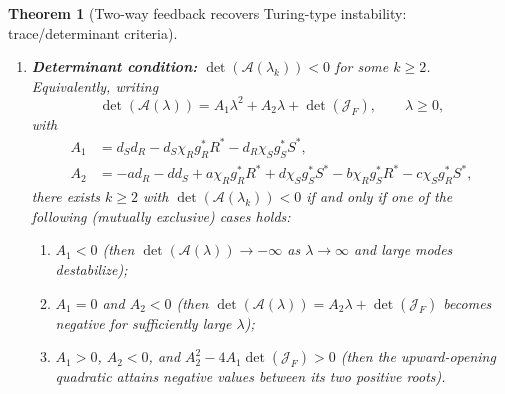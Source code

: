 \documentclass[10pt,a4paper]{amsart}
\newtheorem{theorem}{Theorem}
\begin{document}
\begin{theorem}[Two-way feedback recovers Turing-type instability: trace/determinant criteria]
\begin{enumerate}[label=(\alph*), leftmargin=*]
\item \textbf{Determinant condition:}
$\det(\mathcal{A}(\lambda_k))<0$ for some $k\ge2$.
Equivalently, writing
\begin{equation}
\label{eq:det_quadratic_def}
\det(\mathcal{A}(\lambda))=A_1\lambda^2+A_2\lambda+\det(\mathcal{J}_F),
\qquad \lambda\ge0,
\end{equation}
with
\begin{align}
\label{eq:A1A2_def}
A_{1}
&= d_{S}d_{R}-d_{S}\chi_{R}g_R^*R^*-d_{R}\chi_{S}g_S^*S^*,\nonumber\\
A_{2}
&= -ad_{R}-dd_{S}
+a\chi_{R}g_R^*R^* + d\chi_{S}g_S^*S^*
-b\chi_{R}g_S^*R^* -c\chi_{S}g_R^*S^*,
\end{align}
there exists $k\ge2$ with $\det(\mathcal{A}(\lambda_k))<0$ if and only if one of the following (mutually exclusive) cases holds:
\begin{enumerate}[label=(\roman*), leftmargin=*]
\item $A_1<0$ (then $\det(\mathcal{A}(\lambda))\to -\infty$ as $\lambda\to\infty$ and large modes destabilize);
\item $A_1=0$ and $A_2<0$ (then $\det(\mathcal{A}(\lambda))=A_2\lambda+\det(\mathcal{J}_F)$ becomes negative for sufficiently large $\lambda$);
\item $A_1>0$, $A_2<0$, and $A_2^2-4A_1\det(\mathcal{J}_F)>0$ (then the upward-opening quadratic attains negative values between its two positive roots).
\end{enumerate}
\end{enumerate}
\end{theorem}
\end{document}
